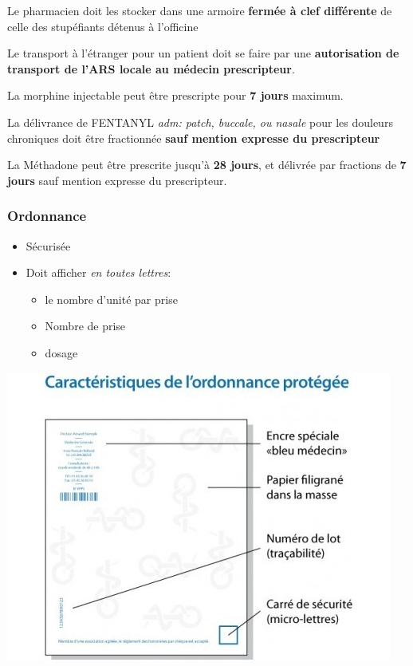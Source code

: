 \documentclass[11pt]{article}
\begin{document}
Le pharmacien doit les stocker dans une armoire \textbf{fermée à clef différente} de celle des stupéfiants détenus à l'officine

Le transport à l'étranger pour un patient doit se faire par une \textbf{autorisation de transport de l'ARS locale au médecin prescripteur}.

La morphine injectable peut être prescripte pour \textbf{7 jours} maximum.

La délivrance de FENTANYL \emph{adm: patch, buccale, ou nasale} pour les douleurs chroniques doit être fractionnée \textbf{sauf mention expresse du prescripteur}

La Méthadone peut être prescrite jusqu'à \textbf{28 jours}, et délivrée par fractions de \textbf{7 jours} sauf mention expresse du prescripteur.

\subsubsection{Ordonnance}
\label{sec:orgd023c98}
\begin{itemize}
\item Sécurisée
\item Doit afficher \emph{en toutes lettres}:
\begin{itemize}
\item le nombre d'unité par prise
\item Nombre de prise
\item dosage
\end{itemize}
\end{itemize}

\begin{center}
\includegraphics[width=.9\linewidth]{./ordo_securisee.png}
\end{center}
\end{document}
